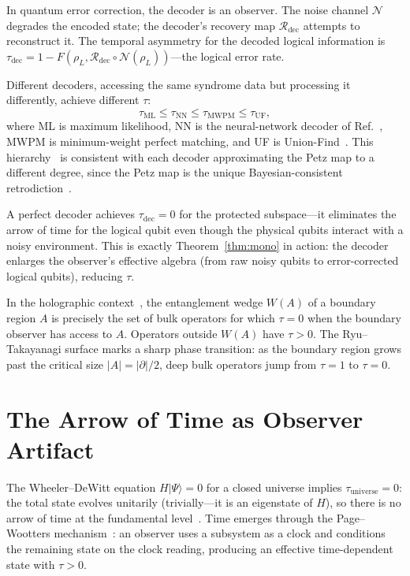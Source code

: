 \documentclass[prl,twocolumn,superscriptaddress,longbibliography,floatfix]{revtex4-2}
\newcommand{\Petz}{\mathcal{R}}
\newcommand{\chan}{\mathcal{N}}
\newcommand{\ket}[1]{|#1\rangle}
\newcommand{\tauasym}{\tau}
\begin{document}
In quantum error correction, the decoder is an observer.
The noise channel $\chan$ degrades the encoded state; the
decoder's recovery map $\Petz_{\mathrm{dec}}$ attempts to
reconstruct it.  The temporal asymmetry for the decoded
logical information is
$\tauasym_{\mathrm{dec}} = 1 - F(\rho_L,
\Petz_{\mathrm{dec}} \circ \chan(\rho_L))$---the logical
error rate.

Different decoders, accessing the same syndrome data but
processing it differently, achieve different $\tauasym$:
\begin{equation}
\tauasym_{\mathrm{ML}} \leq \tauasym_{\mathrm{NN}}
\leq \tauasym_{\mathrm{MWPM}} \leq \tauasym_{\mathrm{UF}},
\label{eq:decoder_hierarchy}
\end{equation}
where ML is maximum likelihood, NN is the neural-network
decoder of Ref.~\cite{Bausch2024}, MWPM is minimum-weight perfect
matching, and UF is Union-Find~\cite{deMartiOlius2024}.  This
hierarchy~\cite{Paper1} is consistent with each decoder
approximating the Petz map to a different degree, since the
Petz map is the unique Bayesian-consistent
retrodiction~\cite{Parzygnat2023}.

A perfect decoder achieves $\tauasym_{\mathrm{dec}} = 0$
for the protected subspace---it eliminates the arrow of time
for the logical qubit even though the physical qubits interact
with a noisy environment.  This is exactly Theorem~\ref{thm:mono} in
action: the decoder enlarges the observer's effective algebra
(from raw noisy qubits to error-corrected logical qubits),
reducing $\tauasym$.

In the holographic context~\cite{AlmheriDongHarlow2015,
Chen2020}, the entanglement wedge $W(A)$ of a boundary region
$A$ is precisely the set of bulk operators for which
$\tauasym = 0$ when the boundary observer has access to $A$.
Operators outside $W(A)$ have $\tauasym > 0$.  The Ryu--Takayanagi
surface marks a sharp phase transition: as the boundary region
grows past the critical size $|A| = |\partial|/2$, deep bulk
operators jump from $\tauasym = 1$ to $\tauasym = 0$.

\section{The Arrow of Time as Observer Artifact}
\label{sec:arrow}

The Wheeler--DeWitt equation $H\ket{\Psi} = 0$ for a closed
universe implies $\tauasym_{\mathrm{universe}} = 0$: the total
state evolves unitarily (trivially---it is an eigenstate of
$H$), so there is no arrow of time at the fundamental
level~\cite{DeWitt1967}.  Time emerges through the Page--Wootters
mechanism~\cite{PageWootters1983}: an observer uses a subsystem
as a clock and conditions the remaining state on the clock
reading, producing an effective time-dependent state with
$\tauasym > 0$.
\end{document}

